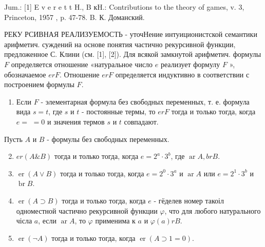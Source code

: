 \documentclass[10pt]{article}
\begin{document}
Jum.: [1] E v e r e t t H., B кH.: Contributions to the theory of games, v. 3, Princeton, 1957 , p. 47-78. B. К. Доманский.



РЕКУ РСИВНАЯ РЕАЛИЗУЕМОСТЬ - уточНение интуиционистской семантики арифметич. суждений на основе понятия частично рекурсивной функции, предложенное С. Клини (см. [1], [2]). Для всякой замкнутой арифметич. формулы $F$ определяется отношение «натуральное число $e$ реализует формулу $F$ », обозначаемое $e r F$. Отношение $e r F$ определяется индуктивно в соответствии с построением формулы $F$.



\begin{enumerate}

  \item Если $F$ - элементарная формула без свободных переменных, т. е. формула вида $s=t$, где $s$ и $t$ - постоянные термы, то $e r F$ тогда и только тогда, когда $e=$ $=0$ и значения термов $s$ и $t$ совпадают.

\end{enumerate}



Пусть $A$ и $B$ - формулы без свободных переменных.



\begin{enumerate}

  \setcounter{enumi}{1}

  \item $e r(A \& B)$ тогда и только тогда, когда $e=2^{a} \cdot 3^{b}$, где $\operatorname{ar} A, b r B$.



  \item $\operatorname{er}(A \vee B)$ тогда и только тогда, когда $e=2^{0} \cdot 3^{a}$ и $\operatorname{ar} A$ или $e=2^{1} \cdot 3^{b}$ и $\operatorname{br} B$.



  \item $\operatorname{er}(A \supset B)$ тогда и только тогда, когда $e$ - гёделев номер такоіл одноместной частично рекурсивной функции $\varphi$, что для любого натурального чісла $a$, если $\operatorname{ar} A$, то $\varphi$ применима к $a$ и $\varphi(a) r B$.



  \item $\operatorname{er}(\neg A)$ тогда и только тогда, когда $\operatorname{er}(A \supset 1=0)$.



\end{enumerate}
\end{document}
